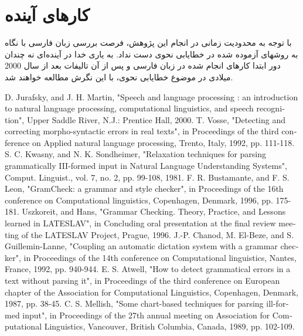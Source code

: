 \documentclass{report}
\renewcommand{\baselinestretch}{1.8}
\begin{document}
\section{کارهای آینده}
با توجه به محدودیت زمانی در انجام این پژوهش، فرصت بررسی زبان فارسی با نگاه به روشهای آزموده شده در خطایابی نحوی دست نداد. به یاری خدا در آینده‌ای نه چندان دور ابتدا کارهای انجام شده در زبان فارسی و پس از آن تالیفات بعد از سال 2000 میلادی در موضوع خطایابی نحوی، با این نگرش مطالعه خواهند شد.

\renewcommand{\baselinestretch}{1}
\renewcommand*{\refname}{\section{منابع}}
\begin{thebibliography}{9}
\begin{latin}
D. Jurafsky, and J. H. Martin, "Speech and language processing : an introduction to natural language processing, computational linguistics, and speech recognition", Upper Saddle River, N.J.: Prentice Hall, 2000.
T. Vosse, "Detecting and correcting morpho-syntactic errors in real texts", in Proceedings of the third conference on Applied natural language processing, Trento, Italy, 1992, pp. 111-118.
S. C. Kwasny, and N. K. Sondheimer, "Relaxation techniques for parsing grammatically III-formed input in Natural Language Understanding Systems", Comput. Linguist., vol. 7, no. 2, pp. 99-108, 1981.
F. R. Bustamante, and F. S. Leon, "GramCheck: a grammar and style checker", in Proceedings of the 16th conference on Computational linguistics, Copenhagen, Denmark, 1996, pp. 175-181.
Uszkoreit, and Hans, "Grammar Checking. Theory, Practice, and Lessons learned in LATESLAV", in Concluding oral presentation at the final review meeting of the LATESLAV Project, Prague, 1996.
J.-P. Chanod, M. El-Beze, and S. Guillemin-Lanne, "Coupling an automatic dictation system with a grammar checker", in Proceedings of the 14th conference on Computational linguistics, Nantes, France, 1992, pp. 940-944.
E. S. Atwell, "How to detect grammatical errors in a text without parsing it", in Proceedings of the third conference on European chapter of the Association for Computational Linguistics, Copenhagen, Denmark, 1987, pp. 38-45.
C. S. Mellish, "Some chart-based techniques for parsing ill-formed input", in Proceedings of the 27th annual meeting on Association for Computational Linguistics, Vancouver, British Columbia, Canada, 1989, pp. 102-109.

\end{latin}
\end{thebibliography}
\end{document}
